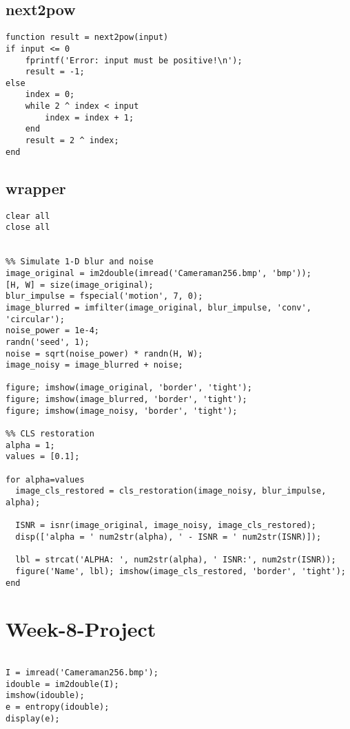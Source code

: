 \documentclass[12 pt]{article}
\begin{document}
 
\subsection{next2pow}

 \begin{lstlisting}
function result = next2pow(input)
if input <= 0
    fprintf('Error: input must be positive!\n');
    result = -1;
else
    index = 0;
    while 2 ^ index < input
        index = index + 1;
    end
    result = 2 ^ index;
end

 \end{lstlisting}

\newpage
\subsection{wrapper}

 \begin{lstlisting}
clear all
close all


%% Simulate 1-D blur and noise
image_original = im2double(imread('Cameraman256.bmp', 'bmp'));
[H, W] = size(image_original);
blur_impulse = fspecial('motion', 7, 0);
image_blurred = imfilter(image_original, blur_impulse, 'conv', 'circular');
noise_power = 1e-4;
randn('seed', 1);
noise = sqrt(noise_power) * randn(H, W);
image_noisy = image_blurred + noise;

figure; imshow(image_original, 'border', 'tight');
figure; imshow(image_blurred, 'border', 'tight');
figure; imshow(image_noisy, 'border', 'tight');

%% CLS restoration
alpha = 1;
values = [0.1];

for alpha=values
  image_cls_restored = cls_restoration(image_noisy, blur_impulse, alpha);

  ISNR = isnr(image_original, image_noisy, image_cls_restored);
  disp(['alpha = ' num2str(alpha), ' - ISNR = ' num2str(ISNR)]);
  
  lbl = strcat('ALPHA: ', num2str(alpha), ' ISNR:', num2str(ISNR));
  figure('Name', lbl); imshow(image_cls_restored, 'border', 'tight');
end
 \end{lstlisting}









 \newpage
 \section{Week-8-Project}
 \begin{lstlisting}
 
I = imread('Cameraman256.bmp');
idouble = im2double(I);
imshow(idouble);
e = entropy(idouble);
display(e);

 \end{lstlisting}
 
\end{document}
